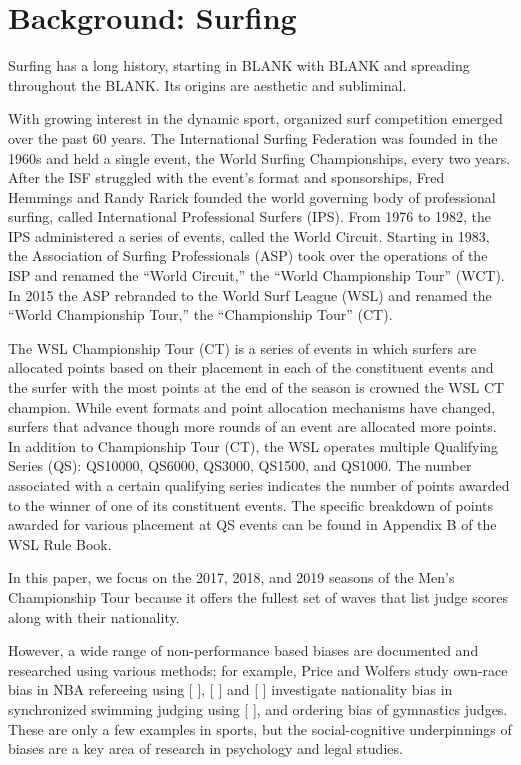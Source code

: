 \documentclass{article}
\theoremstyle{definition}
\begin{document}
\section{Background: Surfing}
Surfing has a long history, starting in BLANK with BLANK and spreading throughout the BLANK. Its origins are aesthetic and subliminal.

With growing interest in the dynamic sport, organized surf competition emerged over the past 60 years. The International Surfing Federation was founded in the 1960s and held a single event, the World Surfing Championships, every two years. After the ISF struggled with the event’s format and sponsorships, Fred Hemmings and Randy Rarick founded the world governing body of professional surfing, called International Professional Surfers (IPS). From 1976 to 1982, the IPS administered a series of events, called the World Circuit. Starting in 1983, the Association of Surfing Professionals (ASP) took over the operations of the ISP and renamed the “World Circuit,” the “World Championship Tour” (WCT). In 2015 the ASP rebranded to the World Surf League (WSL) and renamed the “World Championship Tour,” the “Championship Tour” (CT).  

The WSL Championship Tour (CT) is a series of events in which surfers are allocated points based on their placement in each of the constituent events and the surfer with the most points at the end of the season is crowned the WSL CT champion. While event formats and point allocation mechanisms have changed, surfers that advance though more rounds of an event are allocated more points. In addition to Championship Tour (CT), the WSL operates multiple Qualifying Series (QS): QS10000, QS6000, QS3000, QS1500, and QS1000. The number associated with a certain qualifying series indicates the number of points awarded to the winner of one of its constituent events. The specific breakdown of points awarded for various placement at QS events can be found in Appendix B of the WSL Rule Book.

In this paper, we focus on the 2017, 2018, and 2019 seasons of the Men’s Championship Tour because it offers the fullest set of waves that list judge scores along with their nationality.

However, a wide range of non-performance based biases are documented and researched using various methods; for example, Price and Wolfers study own-race bias in NBA refereeing using [        ], [   ] and [  ] investigate nationality bias in synchronized swimming judging using [       ], and ordering bias of gymnastics judges. These are only a few examples in sports, but the social-cognitive underpinnings of biases are a key area of research in psychology and legal studies.
\end{document}
